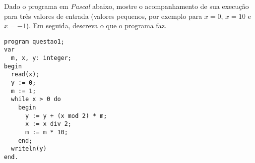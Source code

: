 \item Dado o programa em \emph{Pascal} abaixo, mostre o acompanhamento de sua 
execução para três valores de entrada (valores pequenos, por exemplo para 
$x=0$, $x=10$ e $x=-1$).
Em seguida, descreva o que o programa faz.

\begin{lstlisting}
program questao1;
var
  m, x, y: integer;
begin
  read(x);
  y := 0;
  m := 1;
  while x > 0 do
    begin
      y := y + (x mod 2) * m;
      x := x div 2;
      m := m * 10;
    end;
  writeln(y)
end.
\end{lstlisting}


